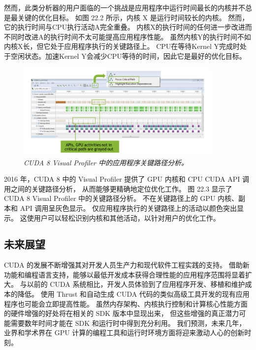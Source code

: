 然而，此类分析器的用户面临的一个挑战是应用程序中运行时间最长的内核并不总是最关键的优化目标。 
如图 22.2 所示，内核 X 是运行时间较长的内核。 然而，它的执行时间与CPU执行活动A完全重叠。
内核X的执行时间的任何进一步改进而不同时改进A的执行时间不太可能提高应用程序性能。 
虽然内核Y的执行时间不如内核X长，但它处于应用程序执行的关键路径上。 
CPU在等待Kernel Y完成时处于空闲状态。加速Kernel Y会减少CPU等待的时间，因此它是最好的优化目标。

\begin{figure}[H]
	\centering
	\includegraphics[width=0.9\textwidth]{figs/F22.3.png}
	\caption{\textit{CUDA 8 Visual Profiler 中的应用程序关键路径分析。}}
\end{figure}

2016 年，CUDA 8 中的 Visual Profiler 提供了 GPU 内核和 CPU CUDA API 调用之间的关键路径分析，
从而能够更精确地定位优化工作。 图 22.3 显示了 CUDA 8 Visual Profiler 中的关键路径分析。 
不在关键路径上的 GPU 内核、副本和 API 调用呈灰色显示。 仅应用程序执行的关键路径上的活动以颜色突出显示。 
这使用户可以轻松识别内核和其他活动，以针对用户的优化工作。

\subsection{未来展望}
CUDA 的发展不断增强其对开发人员生产力和现代软件工程实践的支持。 
借助新功能和编程语言支持，能够以最低开发成本获得合理性能的应用程序范围将显着扩大。 
与以前的 CUDA 系统相比，开发人员体验到了应用程序开发、移植和维护成本的降低。 
使用 Thrust 和自动生成 CUDA 代码的类似高级工具开发的现有应用程序也可能会立即提高性能。 
虽然内存架构、内核执行控制和计算核心性能方面的硬件增强的好处将在相关的 SDK 版本中显现出来，
但这些增强的真正潜力可能需要数年时间才能在 SDK 和运行时中得到充分利用。 
我们预测，未来几年，业界和学术界在 GPU 计算的编程工具和运行时环境方面将迎来激动人心的创新时刻。